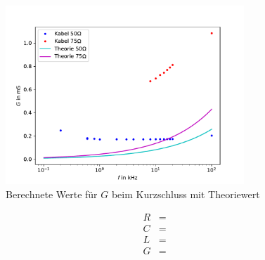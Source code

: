 \begin{figure}[h]
	\centering
	\includegraphics[width=0.8\textwidth]{RLC_DirekteMessung/build/PlotG.pdf}
	\caption{Berechnete Werte für $G$ beim Kurzschluss mit Theoriewert}
	\label{fig:PlotG}
\end{figure}
\begin{align}
	R &=  \\
	C &=  \\
	L &=  \\
	G &= 
\end{align}